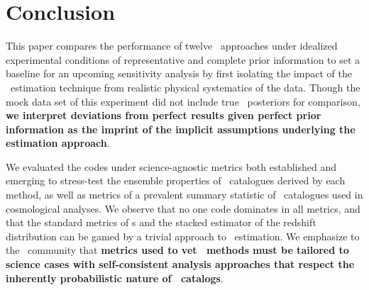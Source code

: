 \section{Conclusion}
\label{sec:conclusion}

This paper compares the performance of twelve \pzpdf\ approaches under idealized experimental conditions of representative and complete prior information to set a baseline for an upcoming sensitivity analysis by first isolating the impact of the \pzpdf\ estimation technique from realistic physical systematics of the data.
Though the mock data set of this experiment did not include true \pz\ posteriors for comparison, \textbf{we interpret deviations from perfect results given perfect prior information as the imprint of the implicit assumptions underlying the estimation approach}.

We evaluated the codes under science-agnostic metrics both established and emerging to stress-test the ensemble properties of \pzpdf\ catalogues derived by each method, as well as metrics of a prevalent summary statistic of \pzpdf\ catalogues used in cosmological analyses.
We observe that no one code dominates in all metrics, and that the standard metrics of \pzpdf s and the stacked estimator of the redshift distribution can be gamed by a trivial approach to \pzpdf\ estimation.
We emphasize to the \pz\ community that \textbf{metrics used to vet \pzpdf\ methods must be tailored to science cases with self-consistent analysis approaches that respect the inherently probabilistic nature of \pzpdf\ catalogs}.
